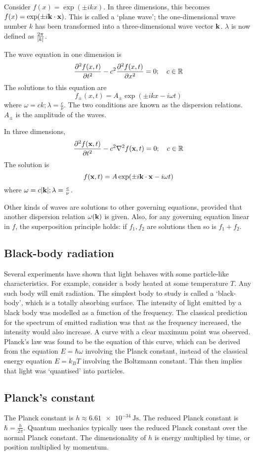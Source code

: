 Consider \( f(x) = \exp(\pm i k x) \).
In three dimensions, this becomes \( f(x) = \exp(\pm i \vb k \cdot \vb x) \).
This is called a `plane wave'; the one-dimensional wave number \( k \) has been transformed into a three-dimensional wave vector \( \vb k \).
\( \lambda \) is now defined as \( \frac{2\pi}{\abs{k}} \).

The wave equation in one dimension is
\[
	\pdv[2]{f(x,t)}{t} - c^2 \pdv[2]{f(x,t)}{x} = 0;\quad c \in \mathbb R
\]
The solutions to this equation are
\[
	f_\pm (x,t) = A_\pm \exp(\pm i k x - i \omega t)
\]
where \( \omega = c k; \lambda = \frac{c}{\nu} \).
The two conditions are known as the dispersion relations.
\( A_\pm \) is the amplitude of the waves.

In three dimensions,
\[
	\pdv[2]{f(\vb x,t)}{t} - c^2 \laplacian f(\vb x,t) = 0;\quad c \in \mathbb R
\]
The solution is
\[
	f (\vb x,t) = A \exp(\pm i \vb k \cdot \vb x - i \omega t)
\]
where \( \omega = c \abs{\vb k}; \lambda = \frac{c}{\nu} \).

\begin{note}
	Other kinds of waves are solutions to other governing equations, provided that another dispersion relation \( \omega(\vb k) \) is given.
	Also, for any governing equation linear in \( f \), the superposition principle holds: if \( f_1, f_2 \) are solutions then so is \( f_1 + f_2 \).
\end{note}

\subsection{Black-body radiation}
Several experiments have shown that light behaves with some particle-like characteristics.
For example, consider a body heated at some temperature \( T \).
Any such body will emit radiation.
The simplest body to study is called a `black-body', which is a totally absorbing surface.
The intensity of light emitted by a black body was modelled as a function of the frequency.
The classical prediction for the spectrum of emitted radiation was that as the frequency increased, the intensity would also increase.
A curve with a clear maximum point was observed.
Planck's law was found to be the equation of this curve, which can be derived from the equation \( E = \hbar \omega \) involving the Planck constant, instead of the classical energy equation \( E = k_B T \) involving the Boltzmann constant.
This then implies that light was `quantised' into particles.

\subsection{Planck's constant}
The Planck constant is \( h \approx \SI{6.61e-34}{\joule\second} \).
The reduced Planck constant is \( \hbar = \frac{h}{2\pi} \).
Quantum mechanics typically uses the reduced Planck constant over the normal Planck constant.
The dimensionality of \( h \) is energy multiplied by time, or position multiplied by momentum.

